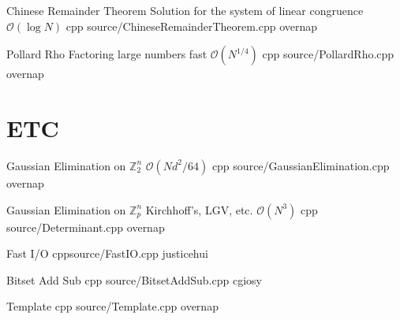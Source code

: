 \documentclass[landscape, 10pt, a4paper, oneside, twocolumn]{extarticle}
\begin{document}

\Algorithm
{Chinese Remainder Theorem}
{Solution for the system of linear congruence}
{$\mathcal{O}(\log{N})$}
{cpp}
{source/ChineseRemainderTheorem.cpp}
{overnap}

\Algorithm
{Pollard Rho}
{Factoring large numbers fast}
{$\mathcal{O}(N^{1/4})$}
{cpp}
{source/PollardRho.cpp}
{overnap}


\section{ETC}

\Algorithm
{Gaussian Elimination on $\mathbb{Z}^n_2$}
{}
{$\mathcal{O}(Nd^2/64)$}
{cpp}
{source/GaussianElimination.cpp}
{overnap}

\Algorithm
{Gaussian Elimination on $\mathbb{Z}^n_p$}
{Kirchhoff's, LGV, etc.}
{$\mathcal{O}(N^3)$}
{cpp}
{source/Determinant.cpp}
{overnap}






\Algorithm
{Fast I/O}
{}
{}
{cpp}{source/FastIO.cpp}
{justicehui}

\Algorithm
{Bitset Add Sub}
{}
{}
{cpp}
{source/BitsetAddSub.cpp}
{cgiosy}

\Algorithm
{Template}
{}
{}
{cpp}
{source/Template.cpp}
{overnap}


\end{document}
